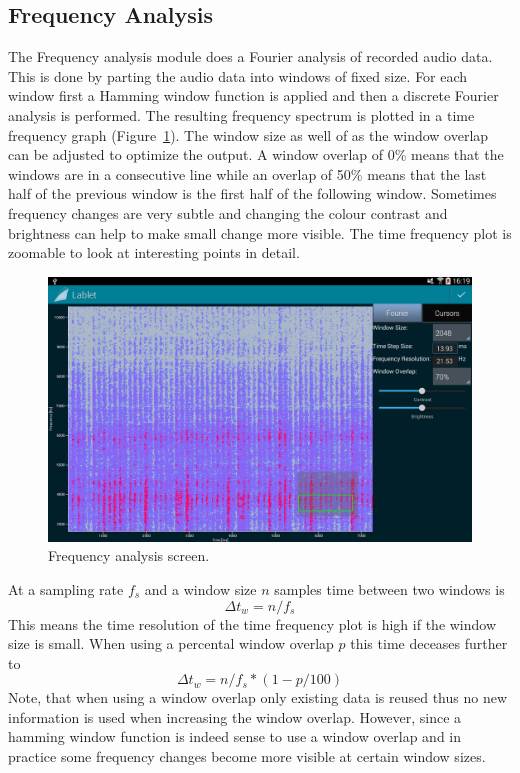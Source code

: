 \documentclass{sigchi}
\begin{document}
\subsection{Frequency Analysis}
The Frequency analysis module does a Fourier analysis of recorded audio data.
This is done by parting the audio data into windows of fixed size.
For each window first a Hamming window function is applied and then a discrete Fourier analysis is performed.
The resulting frequency spectrum is plotted in a time frequency graph (Figure~\ref{fig:FrequencyAnalysis}).
The window size as well of as the window overlap can be adjusted to optimize the output.
A window overlap of 0\% means that the windows are in a consecutive line while an overlap of 50\% means that the last half of the previous window is the first half of the following window.
Sometimes frequency changes are very subtle and changing the colour contrast and brightness can help to make small change more visible.
The time frequency plot is zoomable to look at interesting points in detail. 

\begin{figure}[ht]
\centering
\includegraphics[width=.99\columnwidth]{FrequencyAnalysis}
\caption{Frequency analysis screen.\label{fig:FrequencyAnalysis}
}
\end{figure}

At a sampling rate $f_s$ and a window size $n$ samples time between two windows is
\[
\Delta t_w = n / f_s
\]
This means the time resolution of the time frequency plot is high if the window size is small.
When using a percental window overlap $p$ this time deceases further to
\[
\Delta t_w = n / f_s * (1 - p / 100)
\]
Note, that when using a window overlap only existing data is reused thus no new information is used when increasing the window overlap.
However, since a hamming window function is indeed sense to use a window overlap and in practice some frequency changes become more visible at certain window sizes.
\end{document}
